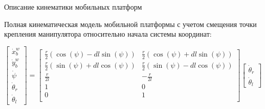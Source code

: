 \documentclass[newPxFont,numfooter,sectionpages]{beamer}
\begin{document}
\begin{frame}{Описание кинематики мобильных платформ}

	\begin{center}
		\begin{minipage}[b]{0.9\textwidth}
			Полная кинематическая модель мобильной платформы с учетом смещения точки крепления манипулятора относительно начала системы координат:
			
		\end{minipage}
		\begin{equation}
			\begin{bmatrix}
			\dot{x}^w_b\\[1mm] \dot{y}^w_b\\[1mm] \dot{\psi}\\[1mm] \dot{\theta}_r\\[1mm] \dot{\theta}_l
			\end{bmatrix} = 
			\begin{bmatrix}
			\frac{r}{2}(\cos(\psi) - dl\sin(\psi)) & \frac{r}{2}(\cos(\psi) + dl\sin(\psi))\\[1mm]
			\frac{r}{2}(\sin(\psi) + dl\cos(\psi)) & \frac{r}{2}(\sin(\psi) - dl\cos(\psi))\\[1mm]
			\frac{r}{2l} & -\frac{r}{2l}\\[1mm]
			1 & 0\\[1mm]
			0 & 1\\[1mm]
			\end{bmatrix}
			\begin{bmatrix}
			\dot{\theta}_r\\[1mm] \dot{\theta}_l
			\end{bmatrix}
			\tag{12} \label{eq:12}
		\end{equation}
	\end{center}
\end{frame}
\end{document}
